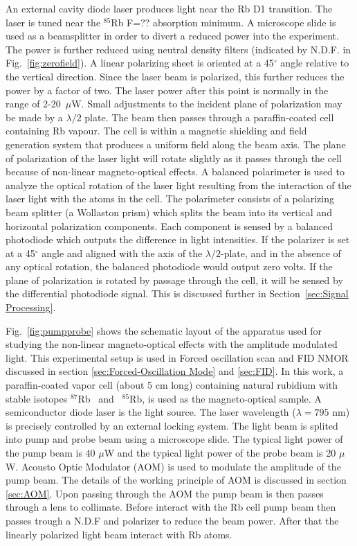   An external cavity diode laser produces light near the Rb D1 transition.  The laser is tuned near the $^{85}$Rb F=?? absorption minimum.  A microscope slide is used as a beamsplitter in order to divert a reduced power into the experiment.  The power is further reduced using neutral density filters (indicated by N.D.F. in Fig.~\ref{fig:zerofield}).  A linear polarizing sheet is oriented at a 45$^\circ$ angle relative to the vertical direction.  Since the laser
beam is polarized, this further reduces the power by a factor of two. The laser power after this point is normally in the range of 2-20~$\mu$W.  Small adjustments to the incident plane of polarization may be made by a $\lambda/2$ plate.  The beam then passes through a paraffin-coated cell containing Rb vapour.  The cell is within a
magnetic shielding and field generation system that produces a uniform field along the beam axis.  The plane of polarization of the laser
light will rotate slightly as it passes through the cell because of
non-linear magneto-optical effects.  A balanced polarimeter is used to
analyze the optical rotation of the laser light resulting from the
interaction of the laser light with the atoms in the cell.  The
polarimeter consists of a polarizing beam splitter (a Wollaston prism)
which splits the beam into its vertical and horizontal polarization
components.  Each component is sensed by a balanced photodiode which
outputs the difference in light intensities.  If the polarizer is set
at a 45$^\circ$ angle and aligned with the axis of the
$\lambda/2$-plate, and in the absence of any optical rotation, the
balanced photodiode would output zero volts.  If the plane of
polarization is rotated by passage through the cell, it will be sensed
 by the differential photodiode signal.  This is discussed further in Section~\ref{sec:Signal Processing}.
 
 Fig.~\ref{fig:pumpprobe}  shows the schematic layout of the apparatus used for studying the
non-linear magneto-optical effects with the amplitude modulated
light. This experimental setup is used in Forced oscillation scan and FID NMOR discussed in section \ref{sec:Forced-Oscillation Mode} and \ref{sec:FID}. In this work, a paraffin-coated vapor cell (about 5 cm long)
containing natural rubidium with stable isotopes $^{87}$Rb~ and~
$^{85}$Rb, is used as the magneto-optical sample. A semiconductor diode laser is the light source. The laser
wavelength ($\lambda=795$ nm) is precisely controlled by an external locking system.  The light beam is splited into pump and
probe beam using a microscope slide. The typical light power of the pump
beam is 40 $\mu$W and the typical light power of the probe beam is 20
$\mu$W.  Acousto Optic Modulator (AOM) is used to modulate the amplitude of the pump beam. The details of the working principle of AOM is discussed in section \ref{sec:AOM}. Upon passing through the AOM the pump beam is then passes through a lens to collimate. Before interact with the Rb cell pump beam then passes trough a N.D.F and polarizer to reduce the beam power. After that the linearly polarized light beam interact with Rb
atoms. 

